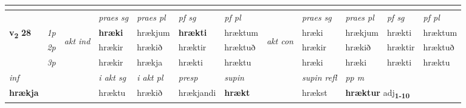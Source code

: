 \begin{longtable}[l]{X>{\footnotesize\itshape}llXXXXlXXXX}
\midrule
   
  & \\
   \midrule
 & &   & \textit{praes sg}  & \textit{praes pl}    & \textit{ pf sg} & \textit{pf pl} & & \textit{praes sg}  & \textit{praes pl}    & \textit{pf sg} & \textit{pf pl }  \\ \cmidrule{4-7} \cmidrule{9-12}
 \multirow{2}{*}{{{\textbf{v{\textsubscript{2}}} \Large{\textbf{28}}}}}  & 1p & \multirow{3}{*}{\begin{turn}{90}\textit{akt ind}\end{turn}} & \textbf{hræki} & hrækjum & \textbf{hrækti} & hræktum & \multirow{3}{*}{\begin{turn}{90}\textit{akt con}\end{turn}} &hræki & hrækjum & hrækti & hræktum\\*
 & 2p &  &  hrækir  & hrækið & hræktir & hræktuð & & hrækir & hrækið & hræktir & hræktuð \\*
 & 3p &  & hrækir & hrækja & hrækti & hræktu & & hræki & hræki& hrækti & hræktu \\*
\cmidrule{4-7} \cmidrule{9-12}

   {\textit{inf}} & &  & \textit{i akt sg} & \textit{i akt pl}   & \textit{presp} & \textit{supin} && \textit{supin refl} & \textit{pp m} \\*
  {\textbf{hrækja}} & && hræktu  & hrækið   & hrækjandi &  \textbf{hrækt} && hrækst & \multicolumn{2}{l}{\textbf{hræktur} adj\textbf{\textsubscript{1-10}}} \\*

\midrule


\end{longtable}
